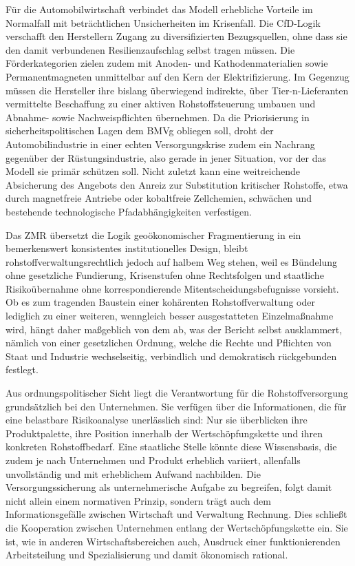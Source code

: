 \documentclass[12pt,a4paper,oneside]{book} %
\begin{document}
{Für die Automobilwirtschaft verbindet das Modell erhebliche Vorteile im Normalfall mit beträchtlichen Unsicherheiten im Krisenfall. Die CfD-Logik verschafft den Herstellern Zugang zu diversifizierten Bezugsquellen, ohne dass sie den damit verbundenen Resilienzaufschlag selbst tragen müssen. Die Förderkategorien zielen zudem mit Anoden- und Kathodenmaterialien sowie Permanentmagneten unmittelbar auf den Kern der Elektrifizierung. Im Gegenzug müssen die Hersteller ihre bislang überwiegend indirekte, über Tier-n-Lieferanten vermittelte Beschaffung zu einer aktiven Rohstoffsteuerung umbauen und Abnahme- sowie Nachweispflichten übernehmen. Da die Priorisierung in sicherheitspolitischen Lagen dem BMVg obliegen soll, droht der Automobilindustrie in einer echten Versorgungskrise zudem ein Nachrang gegenüber der Rüstungsindustrie, also gerade in jener Situation, vor der das Modell sie primär schützen soll. Nicht zuletzt kann eine weitreichende Absicherung des Angebots den Anreiz zur Substitution kritischer Rohstoffe, etwa durch magnetfreie Antriebe oder kobaltfreie Zellchemien, schwächen und bestehende technologische Pfadabhängigkeiten verfestigen.

Das ZMR übersetzt die Logik geoökonomischer Fragmentierung in ein bemerkenswert konsistentes institutionelles Design, bleibt rohstoffverwaltungsrechtlich jedoch auf halbem Weg stehen, weil es Bündelung ohne gesetzliche Fundierung, Krisenstufen ohne Rechtsfolgen und staatliche Risikoübernahme ohne korrespondierende Mitentscheidungsbefugnisse vorsieht. Ob es zum tragenden Baustein einer kohärenten Rohstoffverwaltung oder lediglich zu einer weiteren, wenngleich besser ausgestatteten Einzelmaßnahme wird, hängt daher maßgeblich von dem ab, was der Bericht selbst ausklammert, nämlich von einer gesetzlichen Ordnung, welche die Rechte und Pflichten von Staat und Industrie wechselseitig, verbindlich und demokratisch rückgebunden festlegt.

Aus ordnungspolitischer Sicht liegt die Verantwortung für die Rohstoffversorgung grundsätzlich bei den Unternehmen. Sie verfügen über die Informationen, die für eine belastbare Risikoanalyse unerlässlich sind: Nur sie überblicken ihre Produktpalette, ihre Position innerhalb der Wertschöpfungskette und ihren konkreten Rohstoffbedarf. Eine staatliche Stelle könnte diese Wissensbasis, die zudem je nach Unternehmen und Produkt erheblich variiert, allenfalls unvollständig und mit erheblichem Aufwand nachbilden. Die Versorgungssicherung als unternehmerische Aufgabe zu begreifen, folgt damit nicht allein einem normativen Prinzip, sondern trägt auch dem Informationsgefälle zwischen Wirtschaft und Verwaltung Rechnung. Dies schließt die Kooperation zwischen Unternehmen entlang der Wertschöpfungskette ein. Sie ist, wie in anderen Wirtschaftsbereichen auch, Ausdruck einer funktionierenden Arbeitsteilung und Spezialisierung und damit ökonomisch rational.

}
\end{document}
